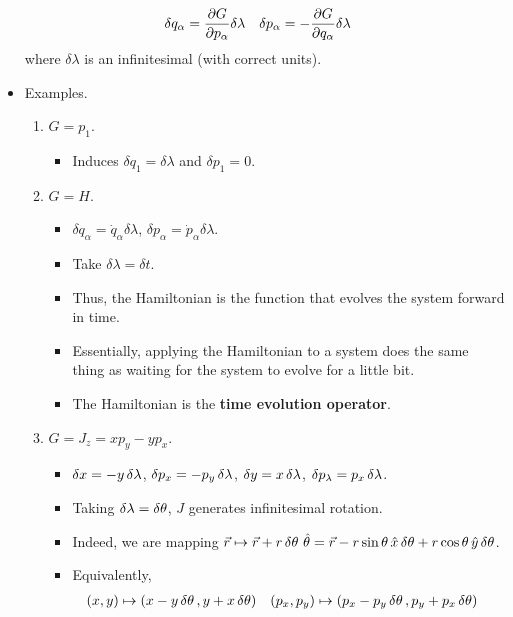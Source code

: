 \documentclass[../notes.tex]{subfiles}
\begin{document}
\begin{itemize}
\begin{align*}
        \delta q_\alpha &= \pdv{G}{p_\alpha}\delta\lambda&
        \delta p_\alpha &= -\pdv{G}{q_\alpha}\delta\lambda
    \end{align*}
    where $\delta\lambda$ is an infinitesimal (with correct units).
    \item Examples.
    \begin{enumerate}
        \item $G=p_1$.
        \begin{itemize}
            \item Induces $\delta q_1=\delta\lambda$ and $\delta p_1=0$.
        \end{itemize}
        \item $G=H$.
        \begin{itemize}
            \item $\delta q_\alpha=\dot{q}_\alpha\delta\lambda$, $\delta p_\alpha=\dot{p}_\alpha\delta\lambda$.
            \item Take $\delta\lambda=\delta t$.
            \item Thus, the Hamiltonian is the function that evolves the system forward in time.
            \item Essentially, applying the Hamiltonian to a system does the same thing as waiting for the system to evolve for a little bit.
            \item The Hamiltonian is the \textbf{time evolution operator}.
        \end{itemize}
        \item $G=J_z=xp_y-yp_x$.
        \begin{itemize}
            \item $\var{x}=-y\var{\lambda}$, $\var{p_x}=-p_y\var{\lambda}$, $\var{y}=x\var{\lambda}$, $\var{p_\lambda}=p_x\var{\lambda}$.
            \item Taking $\var{\lambda}=\var{\theta}$, $J$ generates infinitesimal rotation.
            \item Indeed, we are mapping $\vec{r}\mapsto\vec{r}+r\var{\theta}\,\hat{\theta}=\vec{r}-r\sin\theta\,\hat{x}\var{\theta}+r\cos\theta\,\hat{y}\var{\theta}$.
            \item Equivalently,
            \begin{align*}
                (x,y) &\mapsto (x-y\var{\theta},y+x\var{\theta})&
                (p_x,p_y) &\mapsto (p_x-p_y\var{\theta},p_y+p_x\var{\theta})
            \end{align*}
        \end{itemize}
    \end{enumerate}

\end{itemize}
\end{document}
